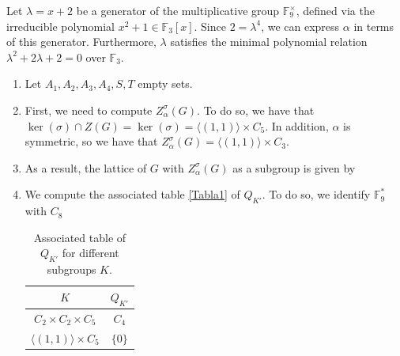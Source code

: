 \documentclass{article}
\begin{document}
Let $\lambda = x + 2$ be a generator of the multiplicative group $\mathbb{F}_{9}^\times$, defined via the irreducible polynomial $x^2 + 1 \in \mathbb{F}_3[x]$. Since $2 = \lambda^4$, we can express $\alpha$ in terms of this generator. Furthermore, $\lambda$ satisfies the minimal polynomial relation $\lambda^2 + 2\lambda + 2 = 0$ over $\mathbb{F}_3$.

\begin{enumerate}
    \item Let $A_1, A_2, A_3, A_4, S,T$ empty sets.


\item First, we need to compute  $Z_\alpha^\sigma(G)$. To do so, we have that $\ker(\sigma) \cap Z(G)= \ker (\sigma) = \langle (1,1) \rangle\times C_5$. In addition, $\alpha$ is symmetric, so we have that $Z_\alpha^\sigma(G) =\langle (1,1) \rangle \times C_3$.


\item As a result, the lattice of $G$ with $Z_\alpha^\sigma(G)$ as a subgroup is given by

\begin{center}
    

\end{center}

\item We compute the associated table \ref{Tabla1} of $Q_{K'}$. To do so, we identify $\mathbb{F}_9^*$ with $C_{8}$

\begin{table} \label{Tabla1}
\caption{Associated table of $Q_{K'}$ for different subgroups $K$.}\label{tbl1}
\begin{tabular}{cc}
\toprule
$K$ & $Q_{K'}$ \\ %
\midrule
$C_2 \times C_2 \times C_5$ & $C_4$ \\
$\langle (1,1) \rangle \times C_5$ & $\{0\}$ \\
\bottomrule
\end{tabular}
\end{table}


\end{enumerate}
\end{document}

